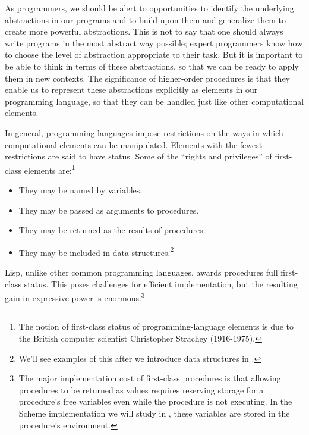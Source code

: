 As programmers, we should be alert to opportunities to identify the underlying
abstractions in our programs and to build upon them and generalize them to
create more powerful abstractions.  This is not to say that one should always
write programs in the most abstract way possible; expert programmers know how
to choose the level of abstraction appropriate to their task.  But it is
important to be able to think in terms of these abstractions, so that we can be
ready to apply them in new contexts.  The significance of higher-order
procedures is that they enable us to represent these abstractions explicitly as
elements in our programming language, so that they can be handled just like
other computational elements.

In general, programming languages impose restrictions on the ways in which
computational elements can be manipulated.  Elements with the fewest
restrictions are said to have  status.  Some of the
``rights and privileges'' of first-class elements are:\footnote{The notion of
first-class status of programming-language elements is due to the British
computer scientist Christopher Strachey (1916-1975).}

\begin{itemize}

\item
They may be named by variables.

\item
They may be passed as arguments to procedures.

\item
They may be returned as the results of procedures.

\item
They may be included in data structures.\footnote{We'll see examples of this
after we introduce data structures in .}

\end{itemize}

\noindent
Lisp, unlike other common programming languages, awards procedures full
first-class status.  This poses challenges for efficient implementation, but
the resulting gain in expressive power is enormous.\footnote{The major
implementation cost of first-class procedures is that allowing procedures to be
returned as values requires reserving storage for a procedure's free variables
even while the procedure is not executing.  In the Scheme implementation we
will study in , these variables are stored in the procedure's
environment.}

